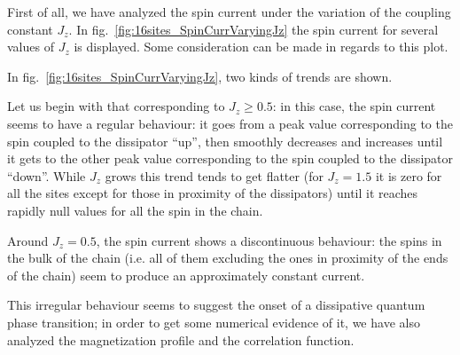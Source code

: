 
First of all, we have analyzed the spin current under the variation of the coupling constant $J_z$. In fig.~\ref{fig:16sites_SpinCurrVaryingJz} the spin current for several values of $J_z$ is displayed. Some consideration can be made in regards to this plot.

In fig.~\ref{fig:16sites_SpinCurrVaryingJz}, two kinds of trends are shown. 

Let us begin with that corresponding to $J_z \geq 0.5$: in this case, the spin current seems to have a regular behaviour: it goes from a peak value corresponding to the spin coupled to the dissipator ``up'', then smoothly decreases and increases until it gets to the other peak value corresponding to the spin coupled to the dissipator ``down''. While $J_z$ grows this trend tends to get flatter (for $J_z = 1.5$ it is zero for all the sites except for those in proximity of the dissipators) until it reaches rapidly null values for all the spin in the chain. 

Around $J_z = 0.5$, the spin current shows a discontinuous behaviour: the spins in the bulk of the chain (i.e. all of them excluding the ones in proximity of the ends of the chain) seem to produce an approximately constant current.


This irregular behaviour seems to suggest the onset of a dissipative quantum phase transition; in order to get some numerical evidence of it, we have also analyzed the magnetization profile and the correlation function.

